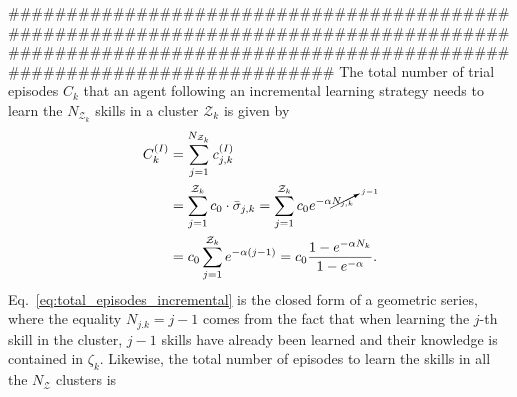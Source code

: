 #############################################################################################################################################################
\clearpage
The total number of trial episodes $ C_k $ that an agent following an incremental learning strategy needs to learn the $N_{\mathcal{Z}_k}$ skills in a cluster $ \mathcal{Z}_k $ is given by
\begin{align}\label{eq:total_episodes_incremental}
	\begin{split}
		C^{(I)}_k &= \sum^{N_{\mathcal{Z}_k}}_{j=1} c^{(I)}_{j,k}  \\
		&= \sum^{{\mathcal{Z}_k}}_{j=1} c_0 \cdot  \bar{\sigma}_{j,k}  = \sum^{{\mathcal{Z}_k}}_{j=1} c_0 e^{-\alpha {\cancelto{j-1}{N_{j,k}}}}\\
		&= c_0 \sum^{{\mathcal{Z}_k}}_{j=1} e^{-\alpha (j-1)}=c_0 \frac{1 - e^{-\alpha N_k}}{1 - e^{-\alpha}}.
	\end{split}
\end{align}
Eq.~\eqref{eq:total_episodes_incremental} is the closed form of a geometric series, where the equality $N_{j.k} = j-1$ comes from the fact that when learning the $j$-th skill in the cluster, $j-1$ skills have already been learned and their knowledge is contained in $\mathcal{\zeta}_k$. Likewise, the total number of episodes to learn the skills in all the $ N_\mathcal{Z} $ clusters is
